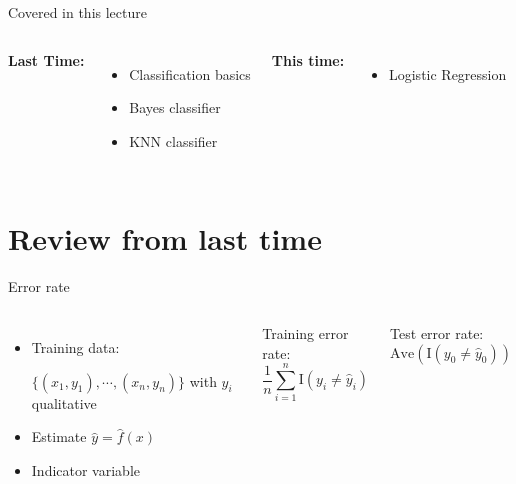 \documentclass[aspectratio=169,usenames,dvipsnames]{beamer}
\newcommand{\InstructorNotes}[1]{\textit{\color{orange}#1}}
\renewcommand{\InstructorNotes}[1]{}
\begin{document}
\begin{frame}[c]{Covered in this lecture }

\begin{columns}
\centering
	\textbf{Last Time:}

	\begin{itemize}
		\item Classification basics 
		\item Bayes classifier
		\item KNN classifier 
	\end{itemize}
\centering
\textbf{This time:}
\begin{itemize}
	
	\item Logistic Regression
\end{itemize}


\end{columns}

\end{frame}

\section{Review from last time}



\begin{frame}[t]{Error rate}



	\begin{columns}
	\centering
	\begin{itemize}
		\item
	Training data:
	
	$\{ (x_1,y_1),\cdots,(x_n,y_n) \}$ with $y_i$ qualitative
	
	\item Estimate $\hat y = \hat f (x)$
	\item Indicator variable
	
	\InstructorNotes{$\mathrm{I}(y_i \neq \hat y_i)$ is 1 if not the same (misclassified) and 0 else}
	\end{itemize}
	
	Training error rate:
	\begin{equation*}
	\frac{1}{n} \sum_{i = 1}^n \mathrm{I}(y_i \neq \hat y_i)
	\end{equation*}
	
	Test error rate:
	\begin{equation*}
		\mathrm{Ave}(\mathrm{I} (y_0 \neq \hat y_0))
	\end{equation*}
	
	\InstructorNotes{Good classifier: one that minimizes test error rate, GET BETTER EXAMPLE FOR THIS}
	
	\end{columns}
	
	\end{frame}
	
\end{document}

